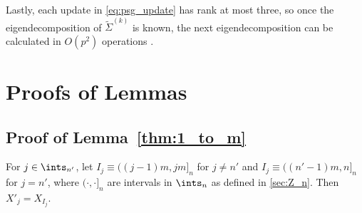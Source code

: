 \documentclass[aos]{imsart}
\begin{document}
\begin{appendix}

\smallskip
Lastly, each update in \cref{eq:psg_update} has rank at most three, so once the eigendecomposition of $\tilde\Sigma^{(k)}$ is known, the next eigendecomposition can be calculated in $O(p^{2})$ operations \citep[Section 5]{golub1973some}.

\section{Proofs of Lemmas}




\subsection{Proof of Lemma~\ref{thm:1_to_m}} \label{sec:pf_1_to_m}

For $j \in \ints_{n'}$, let $I_j \equiv ((j-1)m, jm]_n$ for $j \neq n'$ and $I_j \equiv ((n'-1)m, n]_n$ for $j = n'$, where $(\cdot,\cdot]_n$ are intervals in $\ints_n$ as defined in \cref{sec:Z_n}. Then $X'_j = X_{I_j}$.


\end{appendix}
\end{document}
